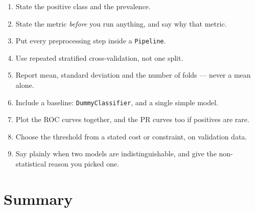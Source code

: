 \documentclass[11pt]{article}
\begin{document}
\begin{enumerate}[leftmargin=*]
  \item State the positive class and the prevalence.
  \item State the metric \emph{before} you run anything, and say why that metric.
  \item Put every preprocessing step inside a \texttt{Pipeline}.
  \item Use repeated stratified cross-validation, not one split.
  \item Report mean, standard deviation and the number of folds --- never a mean
    alone.
  \item Include a baseline: \texttt{DummyClassifier}, and a single simple model.
  \item Plot the ROC curves together, and the PR curves too if positives are
    rare.
  \item Choose the threshold from a stated cost or constraint, on validation
    data.
  \item Say plainly when two models are indistinguishable, and give the
    non-statistical reason you picked one.
\end{enumerate}

\section{Summary}
\end{document}
